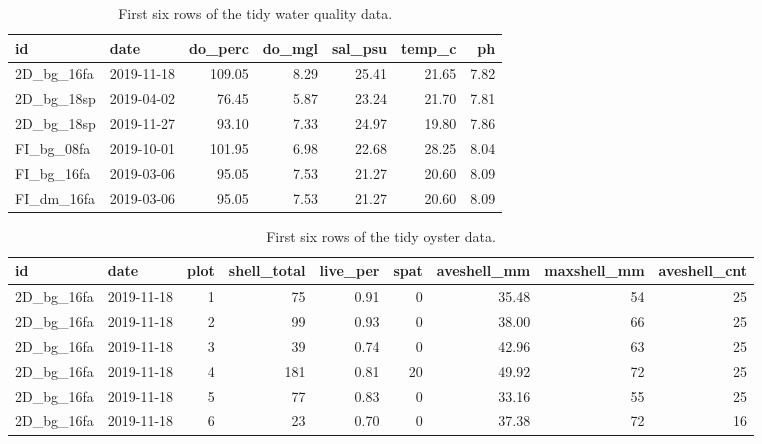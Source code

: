 \documentclass[
]{book}
\begin{document}
\begin{table}

\caption{\label{tab:tabwqmdat}First six rows of the tidy water quality data.}
\centering
\begin{tabular}[t]{l|l|r|r|r|r|r}
\hline
id & date & do\_perc & do\_mgl & sal\_psu & temp\_c & ph\\
\hline
2D\_bg\_16fa & 2019-11-18 & 109.05 & 8.29 & 25.41 & 21.65 & 7.82\\
\hline
2D\_bg\_18sp & 2019-04-02 & 76.45 & 5.87 & 23.24 & 21.70 & 7.81\\
\hline
2D\_bg\_18sp & 2019-11-27 & 93.10 & 7.33 & 24.97 & 19.80 & 7.86\\
\hline
FI\_bg\_08fa & 2019-10-01 & 101.95 & 6.98 & 22.68 & 28.25 & 8.04\\
\hline
FI\_bg\_16fa & 2019-03-06 & 95.05 & 7.53 & 21.27 & 20.60 & 8.09\\
\hline
FI\_dm\_16fa & 2019-03-06 & 95.05 & 7.53 & 21.27 & 20.60 & 8.09\\
\hline
\end{tabular}
\end{table}

\begin{table}

\caption{\label{tab:taboysdat}First six rows of the tidy oyster data.}
\centering
\begin{tabular}[t]{l|l|r|r|r|r|r|r|r}
\hline
id & date & plot & shell\_total & live\_per & spat & aveshell\_mm & maxshell\_mm & aveshell\_cnt\\
\hline
2D\_bg\_16fa & 2019-11-18 & 1 & 75 & 0.91 & 0 & 35.48 & 54 & 25\\
\hline
2D\_bg\_16fa & 2019-11-18 & 2 & 99 & 0.93 & 0 & 38.00 & 66 & 25\\
\hline
2D\_bg\_16fa & 2019-11-18 & 3 & 39 & 0.74 & 0 & 42.96 & 63 & 25\\
\hline
2D\_bg\_16fa & 2019-11-18 & 4 & 181 & 0.81 & 20 & 49.92 & 72 & 25\\
\hline
2D\_bg\_16fa & 2019-11-18 & 5 & 77 & 0.83 & 0 & 33.16 & 55 & 25\\
\hline
2D\_bg\_16fa & 2019-11-18 & 6 & 23 & 0.70 & 0 & 37.38 & 72 & 16\\
\hline
\end{tabular}
\end{table}
\end{document}
